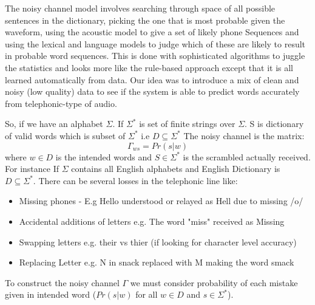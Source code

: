 The noisy channel model involves searching through space of all possible sentences in the dictionary, picking the one that is most probable given the waveform, using the acoustic model to give a set of likely phone Sequences and using the lexical and language models to judge which of these are likely to result in probable word sequences. This is done with sophisticated algorithms to juggle the statistics and looks more like the rule-based approach except that it is all learned automatically from data. \cite{jurafsky_speech_2009} Our idea was to introduce a mix of clean and noisy (low quality) data to see if the system is able to predict words accurately from telephonic-type of audio.
\par
\vspace{11pt}
So, if we have an alphabet $\Sigma$. \newline
\vspace{11pt}
If $\Sigma^*$ is set of finite strings over $\Sigma$. \newline
\vspace{11pt}
S is dictionary of valid words which is subset of $\Sigma^*$ i.e $D \subseteq \Sigma^*$ \newline
\vspace{11pt}
The noisy channel is the matrix: \newline 
\begin{equation*}
    \Gamma_{ws} = Pr(s|w)
\end{equation*} 
\vspace{11pt}
where $w \in D$ is the intended words and $S \in \Sigma^*$ is the scrambled actually received.  \cite{brill_improved_2000} 
\vspace{11pt}
For instance If $\Sigma$ contains all English alphabets and English Dictionary is $D \subseteq \Sigma^*$. There can be several losses in the telephonic line like: 
\begin{itemize}
    \item Missing phones - E.g Hello understood or relayed as Hell due to missing /o/ 
    \item Accidental additions of letters e.g. The word "miss" received as Missing
    \item Swapping letters e.g. their vs thier (if looking for character level accuracy)
    \item Replacing Letter e.g. N in snack replaced with  M making the word smack
\end{itemize}

To construct the noisy channel $\Gamma$ we must consider probability of each mistake given in intended word ($Pr(s|w)$ for all $w \in D$ and $s \in \Sigma^*$). 

